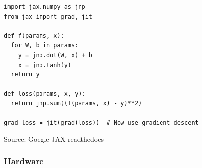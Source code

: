 \documentclass[
    xcolor={svgnames,dvipsnames},
    hyperref={colorlinks, citecolor=DeepPink4, linkcolor=DarkRed, urlcolor=DarkBlue}
    ]{beamer}  %
\newcommand{\1}{\mathbbm 1}
\begin{document}
\begin{frame}
    

    \begin{figure}
       \begin{center}
       \end{center}
    \end{figure}


\end{frame}


\begin{frame}[fragile]
    
    \begin{verbatim}
import jax.numpy as jnp
from jax import grad, jit

def f(params, x):
  for W, b in params:
    y = jnp.dot(W, x) + b
    x = jnp.tanh(y)  
  return y                

def loss(params, x, y):
  return jnp.sum((f(params, x) - y)**2)

grad_loss = jit(grad(loss))  # Now use gradient descent 
    \end{verbatim}


    Source: Google JAX readthedocs

\end{frame}

\begin{frame}
    \frametitle{Hardware}
    
    \begin{figure}
       \begin{center}
       \end{center}
    \end{figure}


\end{frame}
\end{document}
